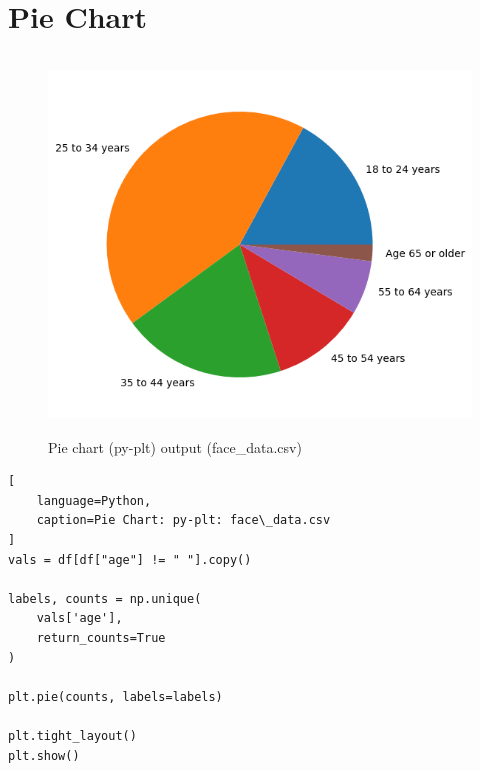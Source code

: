 \section{Pie Chart \cite{data/online/matplotlib.pyplot.pie}} \label{Visualizing Data/Pie Chart}


\begin{table}[H]
\begin{minipage}[t]{0.35\linewidth}
\begin{figure}[H]
    \centering
    \includegraphics[width=0.9\linewidth, height=10cm, keepaspectratio]{images/data/__visualizations__/plt-pie-age-face-data.png}
    \caption{Pie chart (py-plt) output (face\_data.csv)}
\end{figure}
\end{minipage}
\hspace{0.2cm}
\vrule width 1pt
\hspace{0.5cm}
\begin{minipage}[t]{0.57\linewidth}
\begin{lstlisting}[
    language=Python,
    caption=Pie Chart: py-plt: face\_data.csv
]
vals = df[df["age"] != " "].copy()

labels, counts = np.unique(
    vals['age'],
    return_counts=True
)

plt.pie(counts, labels=labels)

plt.tight_layout()
plt.show()
\end{lstlisting}
\end{minipage}
\end{table}

